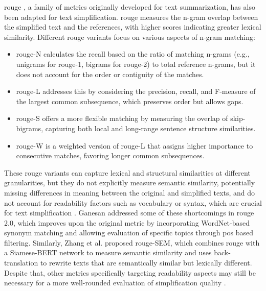\gls{rouge} \cite{xu-etal-2016-optimizing}, a family of metrics originally developed for text summarization, has also been adapted for text simplification.
\gls{rouge} measures the n-gram overlap between the simplified text and the references, with higher scores indicating greater lexical similarity.
Different \gls{rouge} variants focus on various aspects of n-gram matching:
\begin{itemize}
    \item \gls{rouge}-N calculates the recall based on the ratio of matching n-grams (e.g., unigrams for \gls{rouge}-1, bigrams for \gls{rouge}-2) to total reference n-grams, but it does not account for the order or contiguity of the matches. 
    \item \gls{rouge}-L addresses this by considering the precision, recall, and F-measure of the largest common subsequence, which preserves order but allows gaps. 
    \item \gls{rouge}-S offers a more flexible matching by measuring the overlap of skip-bigrams, capturing both local and long-range sentence structure similarities. 
    \item \gls{rouge}-W is a weighted version of \gls{rouge}-L that assigns higher importance to consecutive matches, favoring longer common subsequences.
\end{itemize}
These \gls{rouge} variants can capture lexical and structural similarities at different granularities, but they do not explicitly measure semantic similarity, potentially missing differences in meaning between the original and simplified texts, and do not account for readability factors such as vocabulary or syntax, which are crucial for text simplification \cite{xu2024reasoningcomparisonllmenhancedsemantic}.
Ganesan \cite{ganesan2018rouge20updatedimproved} addressed some of these shortcomings in \gls{rouge} 2.0, which improves upon the original metric by incorporating WordNet-based synonym matching and allowing evaluation of specific topics through \gls{pos} based filtering. Similarly, Zhang et al. \cite{ZHANG2024121364} proposed \gls{rouge}-SEM, which combines \gls{rouge} with a Siamese-BERT network to measure semantic similarity and uses back-translation to rewrite texts that are semantically similar but lexically different.
Despite that, other metrics specifically targeting readability aspects may still be necessary for a more well-rounded evaluation of simplification quality \cite{li2024largelanguagemodelsbiomedical}.

